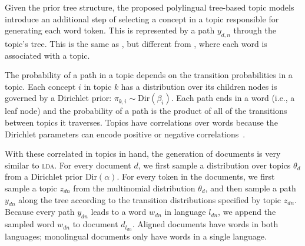 Given the prior tree structure, the proposed polylingual tree-based topic models introduce an additional step of selecting a concept in a topic responsible for generating each word token. This is represented by a path $y_{d,n}$ through the topic's tree. This is the same as \tlda{}, but different from , where each word is associated with a topic. 



The probability of a path in a topic depends on the transition probabilities in a topic.  Each concept $i$ in topic $k$ has a distribution over its children nodes is governed by a Dirichlet prior: $\pi_{k,i} \sim \text{Dir}(\beta_{i})$.  Each path ends in a word (i.e., a leaf node) and the probability of a path is the product of all of the transitions between topics it traverses. Topics have correlations over words because the Dirichlet parameters can encode positive or negative correlations~\citep{andrzejewski-09}.

With these correlated in topics in hand, the generation of documents is very similar to \textsc{lda}.  For every document $d$, we first sample a distribution over topics $\theta_d$ from a Dirichlet prior $\text{Dir}(\alpha)$.  For every token in the documents, we first sample a topic $z_{dn}$ from the multinomial distribution $\theta_d$, and then sample a path $y_{dn}$ along the tree according to the transition distributions specified by topic $z_{dn}$.  Because every path $y_{dn}$ leads to a word $w_{dn}$ in language $l_{dn}$, we append the sampled word $w_{dn}$ to document $d_{l_{dn}}$.  Aligned documents have words in both languages; monolingual documents only have words in a single language. 

